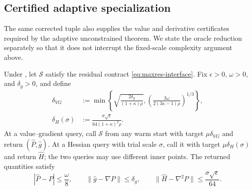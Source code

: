 \documentclass{article}
\begin{document}
\subsection{Certified adaptive specialization}

The same corrected tuple also supplies the value and derivative
certificates required by the adaptive unconstrained theorem.  We state
the oracle reduction separately so that it does not interrupt the
fixed-scale complexity argument above.

\begin{corollary}
\label{cor:ncsc-adaptive-oracle}
Under , let $\mathcal S$ satisfy the residual contract
\eqref{eq:maxres-interface}.  Fix $\epsilon>0$, $\omega>0$, and
$\delta_g>0$, and define
\begin{subequations}\label{eq:ncsc-adaptive-distances}
\begin{align}
 \delta_{VG}
 &:={\min}\left\{
 \sqrt{\frac{2\delta_g}{(1+\kappa)\rho}},
 \left(\frac{3\omega}{2(3\kappa-1)\rho}\right)^{1/3}
 \right\},
 \label{eq:ncsc-adaptive-vg-distance}\\
 \delta_H(\sigma)
 &:=\frac{\sigma\sqrt\epsilon}
 {64(1+\kappa)^2\rho}.
 \label{eq:ncsc-adaptive-h-distance}
\end{align}
\end{subequations}
At a value--gradient query, call $\mathcal S$ from any warm start with
target $\mu\delta_{VG}$ and return $(\widehat P,\widehat g)$.  At a
Hessian query with trial scale $\sigma$, call it with target
$\mu\delta_H(\sigma)$ and return $\widehat H$; the two queries may use
different inner points.  The returned quantities satisfy
\begin{equation}\label{eq:ncsc-adaptive-certificates}
 |\widehat P-P|\le\frac\omega8,
 \qquad
 \|\widehat g-\nabla P\|\le\delta_g,
 \qquad
 \|\widehat H-\nabla^2P\|
 \le\frac{\sigma\sqrt\epsilon}{64}.
\end{equation}
\end{corollary}
\end{document}

